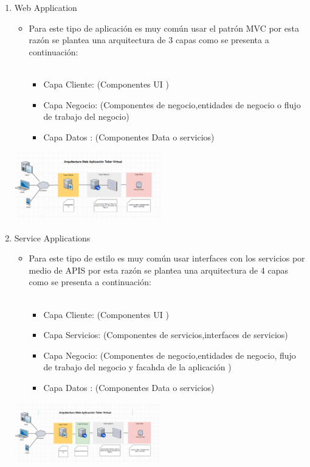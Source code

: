\documentclass[10pt,a4paper,openany]{book}
\begin{document}
\begin{enumerate}
\item Web Application
\begin{itemize}
	\item Para este tipo de aplicación es muy común usar el patrón MVC por esta razón se plantea una arquitectura de 3 capas como se presenta a continuación:\\\\
\begin{itemize}
\item Capa Cliente: (Componentes UI )
\item Capa Negocio: (Componentes de negocio,entidades de negocio o flujo de trabajo del negocio)
\item Capa Datos  : (Componentes Data o servicios)
\end{itemize}
\end{itemize}
\begin{center}
\includegraphics[width=0.5\textwidth]{oc_img2}
\end{center}
\item Service Applications
\begin{itemize}
	\item  Para este tipo de estilo es muy común usar interfaces con los servicios por medio de APIS por esta razón se plantea una arquitectura de 4 capas como se presenta a continuación:\\\\
	
\begin{itemize}	
	\item Capa Cliente: (Componentes UI )
\item Capa Servicios: (Componentes de servicios,interfaces de servicios)
\item Capa Negocio: (Componentes de negocio,entidades de negocio, flujo de trabajo del negocio y facahda de la aplicación )
\item Capa Datos  : (Componentes Data o servicios)

\end{itemize}	
\end{itemize}
\begin{center}


\includegraphics[width=0.5\textwidth]{oc_img3}
\end{center}
\end{enumerate}
\end{document}
